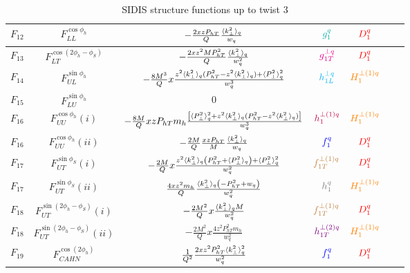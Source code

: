 \documentclass[floatfix,aps,prd,nofootinbib,superscriptaddress,preprint]{revtex4}
\newcommand\3[1]{\boldsymbol{#1}}
\newcommand{\Phperp}{P_{hT}}
\begin{document}
\begin{table}[h!]
\begin{tabular}{|c|c|c|c|c|c|c|}
$F_{12}$ & $F_{LL}^{\cos\phi_h}$               & $-\frac{2xz\Phperp}{Q}\frac{\avk}{w_q}$                                                     & $\ppdf$         & ${\color{red} D_1^{q}}$           \\\hline
$F_{13}$ & $F_{LT}^{\cos(2\phi_h -\phi_S)}$    & $-\frac{2 x z^2 M \Phperp^2}{Q}\frac{\avk}{w_q^2}$                                          & ${\color{magenta} g^{\perp q}_{1T}}$          & ${\color{red} D_1^{q}}$           \\\hline
$F_{14}$ & $F_{UL}^{\sin\phi_h}$               & $-\frac{8M^3}{Q} x \frac{z^2\avk (\Phperp^2-z^2\avk)+\avp^2}{w_q^3}$                        & ${\color{cyan}h^{\perp q}_{1L}}$          & ${\color{orange} H^{\perp(1)q}_{1} }$      \\\hline
$F_{15}$ & $F_{LU}^{\sin\phi_h}$               & $0$                                                                                         &                 & \\\hline
$F_{16}$ & $F_{UU}^{\cos\phi_h}(i)$            & $-\frac{8M}{Q} xz\Phperp m_h \frac{\left[\avp^2+z^2 \avk (\Phperp^2  -z^2\avk ) \right]}{w_q^3}$ & ${\color{purple} h^{\perp(1)q}_1 }$  & ${\color{orange} H^{\perp(1)q}_{1} }$      \\\hline
$F_{16}$ & $F_{UU}^{\cos\phi_h}(ii)$           & $-\frac{2M}{Q} \frac{xz\Phperp}{M} \frac{\avk}{w_q}$                                                           & ${\color{blue} f_1^q}$          & ${\color{red} D_1^{q}} $          \\\hline
$F_{17}$ & $F_{UT}^{\sin\phi_S}(i)$            & $-\frac{2M}{Q} x \frac{z^2\avk \left(\Phperp^2+\avp\right) + \avp^2}{w_q^2}$                & ${\color{brown} f^{\perp(1)q}_{1T}}$       & ${\color{red} D_1^{q}}$           \\\hline
$F_{17}$ & $F_{UT}^{\sin\phi_S}(ii)$           & $\frac{4 x z^2 m_h}{Q}\frac{\avk\left(-\Phperp^2+w_q\right)}{w_q^2} $                       & $\transversity$ & ${\color{orange} H^{\perp(1)q}_{1} }$      \\\hline
$F_{18}$ & $F_{UT}^{\sin(2\phi_h-\phi_S)}(i)$  & $-\frac{2M^2}{Q} x \frac{\langle k_{\perp}^2\rangle_q M}{w_q^2} $                                                   & ${\color{brown} f^{\perp(1)q}_{1T}}$       & ${\color{red} D_1^{q}}$           \\\hline
$F_{18}$ & $F_{UT}^{\sin(2\phi_h-\phi_S)}(ii)$ & $-\frac{2M^2}{Q} x \frac{4z^2 \Phperp^2 m_h}{w_q^2}$                                        & ${\color{violet} h^{\perp(2)q}_{1T} }$ & ${\color{orange} H^{\perp(1)q}_{1} }$      \\\hline
$F_{19}$ & $F_{CAHN}^{\cos(2\phi_h)}$          & $\frac{1}{Q^2} \frac{2 x z^2 \Phperp^2 \avk^2}{w_q^2}$                                      & ${\color{blue} f_1^q}$          & ${\color{red} D_1^{q}} $          \\\hline
\end{tabular}
\caption{SIDIS structure functions up to twist 3}
\label{t.chi2}
\end{table}
\end{document}

